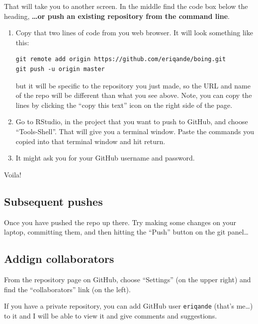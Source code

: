 \documentclass[]{book}
\theoremstyle{definition}
\theoremstyle{definition}
\theoremstyle{remark}
\begin{document}
That will take you to another screen. In the middle find the code box
below the heading, \textbf{\ldots{}or push an existing repository from
the command line}.

\begin{enumerate}
\def\labelenumi{\arabic{enumi}.}
\item
  Copy that two lines of code from you web browser. It will look
  something like this:

\begin{verbatim}
git remote add origin https://github.com/eriqande/boing.git
git push -u origin master
\end{verbatim}

  but it will be specific to the repository you just made, so the URL
  and name of the repo will be different than what you see above. Note,
  you can copy the lines by clicking the ``copy this text'' icon on the
  right side of the page.
\item
  Go to RStudio, in the project that you want to push to GitHub, and
  choose ``Tools-Shell''. That will give you a terminal window. Paste
  the commands you copied into that terminal window and hit return.
\item
  It might ask you for your GitHub username and password.
\end{enumerate}

Voila!

\subsection{Subsequent pushes}\label{subsequent-pushes}

Once you have pushed the repo up there. Try making some changes on your
laptop, committing them, and then hitting the ``Push'' button on the git
panel\ldots{}

\subsection{Addign collaborators}\label{addign-collaborators}

From the repository page on GitHub, choose ``Settings'' (on the upper
right) and find the ``collaborators'' link (on the left).

If you have a private repository, you can add GitHub user
\texttt{eriqande} (that's me\ldots{}) to it and I will be able to view
it and give comments and suggestions.


\end{document}
